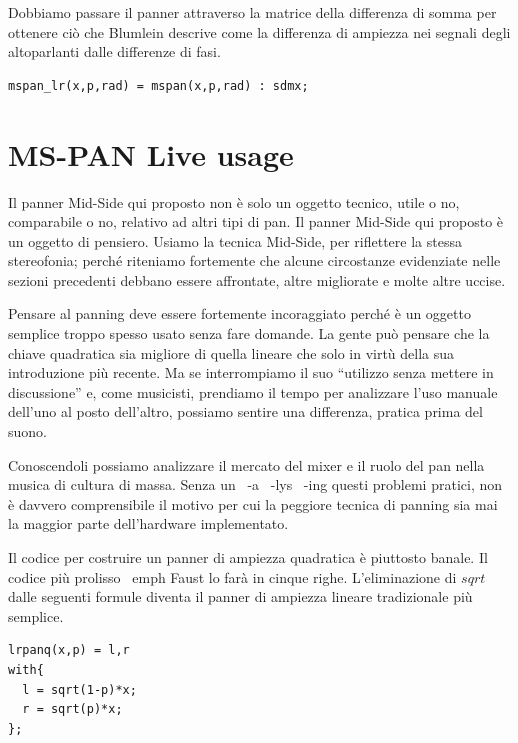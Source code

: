 Dobbiamo passare il panner attraverso la matrice della differenza di somma per
ottenere ciò che Blumlein descrive come la differenza di ampiezza nei segnali
degli altoparlanti dalle differenze di fasi.

\begin{lstlisting}
mspan_lr(x,p,rad) = mspan(x,p,rad) : sdmx;
\end{lstlisting}

\section{MS-PAN Live usage}

Il panner Mid-Side qui proposto non è solo un oggetto tecnico, utile o no,
comparabile o no, relativo ad altri tipi di pan. Il panner Mid-Side qui proposto
è un oggetto di pensiero. Usiamo la tecnica Mid-Side, per riflettere la stessa
stereofonia; perché riteniamo fortemente che alcune circostanze evidenziate
nelle sezioni precedenti debbano essere affrontate, altre migliorate e molte
altre uccise.

Pensare al panning deve essere fortemente incoraggiato perché è un oggetto
semplice troppo spesso usato senza fare domande. La gente può pensare che la
chiave quadratica sia migliore di quella lineare che solo in virtù della sua
introduzione più recente. Ma se interrompiamo il suo “utilizzo senza mettere in
discussione” e, come musicisti, prendiamo il tempo per analizzare l'uso manuale
dell'uno al posto dell'altro, possiamo sentire una differenza, pratica prima del
suono.

Conoscendoli possiamo analizzare il mercato del mixer e il ruolo del pan nella
musica di cultura di massa. Senza un \ -a \ -lys \ -ing questi problemi pratici,
non è davvero comprensibile il motivo per cui la peggiore tecnica di panning sia
mai la maggior parte dell'hardware implementato.

Il codice per costruire un panner di ampiezza quadratica è piuttosto banale.
Il codice più prolisso \ emph {Faust} lo farà in cinque righe. L'eliminazione di
$sqrt$ dalle seguenti formule diventa il panner di ampiezza lineare tradizionale
più semplice.

\begin{lstlisting}
lrpanq(x,p) = l,r
with{
  l = sqrt(1-p)*x;
  r = sqrt(p)*x;
};
\end{lstlisting}

